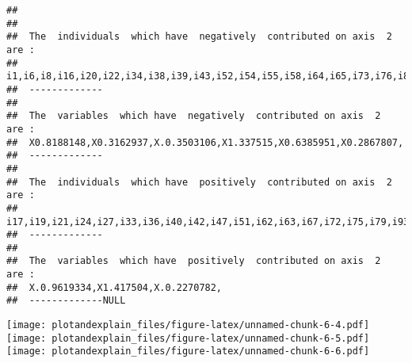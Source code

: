 \documentclass[]{article}
\begin{document}
\begin{verbatim}
##  
##  
##  The  individuals  which have  negatively  contributed on axis  2  are :  
##  i1,i6,i8,i16,i20,i22,i34,i38,i39,i43,i52,i54,i55,i58,i64,i65,i73,i76,i82,i88,i94,i106,i107,i108,i115,i116,i120,i124,i129,i133,i136,i139,i154,i158,i161,i178,i180,i198,i206,i208,i226,i229,i233,i234,i238,i247,i256,i258,i262,i263,i265,i289,i292,i296,i298,i299,i306,i311,i320,i329,i336,i338,i340,i356,i362,i363,i367,i390,i394,i398,i399,i403,i410,i412,i414,i418,i441,i446,i447,i465,i466,i473,i477,i480,i484,i490,i494,i495,i498,i500,i504,i505,i515,i536,i540,i549,i557,i558,i560,i567,i577,i579,i584,i623,i626,i634,i647,i648,i663,i665,i668,i669,i670,i672,i681,i684,i702,i704,i706,i712,i720,i738,i742,i745,i750,i757,i769,i778,i779,i780,i782,i783,i787,i789,i796,i798,i799,i808,i813,i815,i818,i822,i830,i832,i841,i846,i854,i857,i871,i874,i876,i884,i892,i903,i915,i925,i936,i947,i954,i962,i965,i968,i975,i985,i988,i993,i994, 
##  ------------- 
##  
##  The  variables  which have  negatively  contributed on axis  2  are :  
##  X0.8188148,X0.3162937,X.0.3503106,X1.337515,X0.6385951,X0.2867807, 
##  ------------- 
##  
##  The  individuals  which have  positively  contributed on axis  2  are :  
##  i17,i19,i21,i24,i27,i33,i36,i40,i42,i47,i51,i62,i63,i67,i72,i75,i79,i93,i98,i121,i123,i127,i137,i145,i151,i155,i162,i163,i169,i172,i173,i187,i189,i207,i211,i212,i214,i215,i217,i220,i225,i227,i237,i241,i251,i264,i267,i268,i270,i281,i284,i286,i297,i310,i312,i319,i323,i325,i332,i333,i339,i345,i357,i364,i365,i377,i381,i382,i395,i400,i406,i425,i440,i442,i449,i451,i452,i461,i464,i481,i482,i493,i512,i517,i526,i528,i530,i535,i548,i563,i569,i574,i578,i583,i595,i597,i598,i599,i611,i612,i630,i637,i638,i642,i654,i656,i660,i686,i687,i695,i718,i723,i725,i726,i729,i732,i736,i741,i748,i752,i753,i756,i759,i766,i771,i772,i774,i794,i802,i803,i807,i812,i814,i829,i844,i845,i851,i864,i867,i869,i878,i882,i885,i891,i893,i894,i896,i897,i900,i906,i917,i918,i919,i923,i930,i933,i934,i937,i942,i951,i953,i961,i966,i969,i971,i978,i980,i983,i998,i999, 
##  ------------- 
##  
##  The  variables  which have  positively  contributed on axis  2  are :  
##  X.0.9619334,X1.417504,X.0.2270782, 
##  -------------NULL
\end{verbatim}

\texttt{[image: plotandexplain\_files/figure-latex/unnamed-chunk-6-4.pdf]}
\texttt{[image: plotandexplain\_files/figure-latex/unnamed-chunk-6-5.pdf]}
\texttt{[image: plotandexplain\_files/figure-latex/unnamed-chunk-6-6.pdf]}
\end{document}
